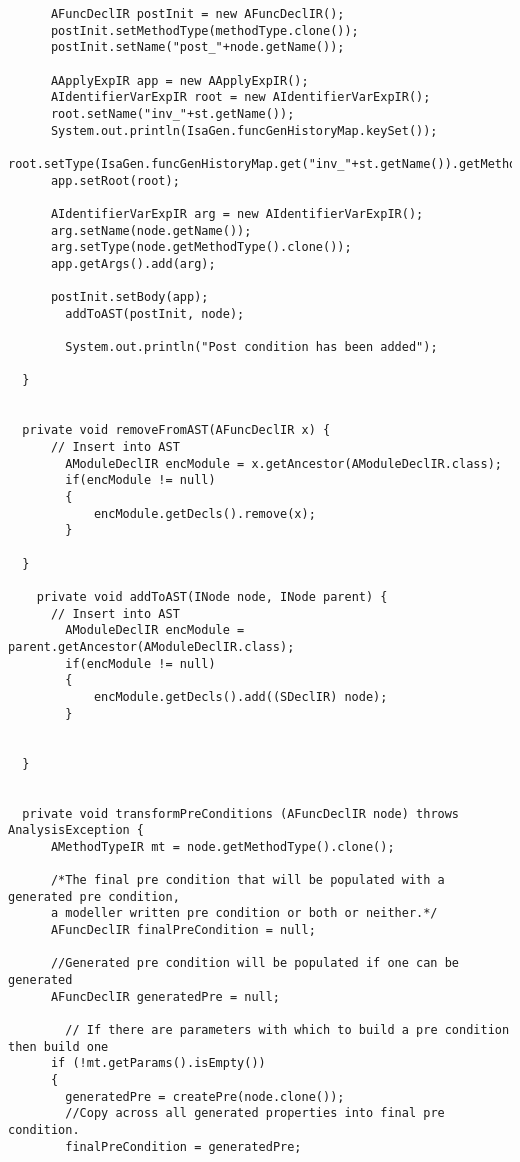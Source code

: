 \begin{appendices}
\begin{lstlisting}
      AFuncDeclIR postInit = new AFuncDeclIR();
      postInit.setMethodType(methodType.clone());     
      postInit.setName("post_"+node.getName());
      
      AApplyExpIR app = new AApplyExpIR();
      AIdentifierVarExpIR root = new AIdentifierVarExpIR();
      root.setName("inv_"+st.getName());
      System.out.println(IsaGen.funcGenHistoryMap.keySet());
      root.setType(IsaGen.funcGenHistoryMap.get("inv_"+st.getName()).getMethodType().clone());
      app.setRoot(root);
      
      AIdentifierVarExpIR arg = new AIdentifierVarExpIR();
      arg.setName(node.getName());
      arg.setType(node.getMethodType().clone());
      app.getArgs().add(arg);
      
      postInit.setBody(app);
        addToAST(postInit, node);

        System.out.println("Post condition has been added");
    
  }


  private void removeFromAST(AFuncDeclIR x) {
      // Insert into AST
        AModuleDeclIR encModule = x.getAncestor(AModuleDeclIR.class);
        if(encModule != null)
        {
            encModule.getDecls().remove(x);
        }
    
  }

    private void addToAST(INode node, INode parent) {
      // Insert into AST
        AModuleDeclIR encModule = parent.getAncestor(AModuleDeclIR.class);
        if(encModule != null)
        {
            encModule.getDecls().add((SDeclIR) node);
        }

    
  }
    

  private void transformPreConditions (AFuncDeclIR node) throws AnalysisException {
      AMethodTypeIR mt = node.getMethodType().clone();
      
      /*The final pre condition that will be populated with a generated pre condition,
      a modeller written pre condition or both or neither.*/
      AFuncDeclIR finalPreCondition = null;
      
      //Generated pre condition will be populated if one can be generated
      AFuncDeclIR generatedPre = null;
      
        // If there are parameters with which to build a pre condition then build one
      if (!mt.getParams().isEmpty())
      {
        generatedPre = createPre(node.clone());     
        //Copy across all generated properties into final pre condition.
        finalPreCondition = generatedPre;
        

\end{lstlisting}
\end{appendices}
